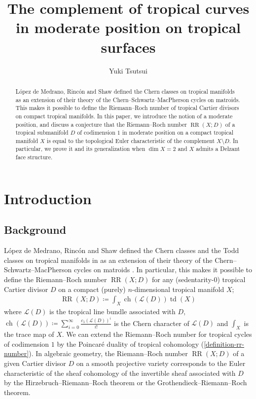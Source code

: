 \documentclass[a4paper,dvipdfmx,reqno,12pt]{amsart}
\title{The complement of tropical curves in moderate position on
tropical surfaces}
\author[Y. Tsutsui]{Yuki Tsutsui}
\theoremstyle{definition}
\newcommand{\deq}{\coloneqq}
\newcommand{\opn}[1]{\operatorname{#1}}
\numberwithin{equation}{section}
\begin{document}
\begin{abstract}
L\'opez de Medrano, Rinc\'on and Shaw defined 
the Chern classes on
tropical manifolds as an extension
of their theory of
the Chern--Schwartz--MacPherson cycles on matroids.
This makes it possible to define
the Riemann--Roch number of tropical Cartier divisors
on compact tropical manifolds.
In this paper,
we introduce the notion of a moderate position,
and discuss a conjecture
that the Riemann--Roch number
$\opn{RR}(X;D)$ of
a tropical submanifold $D$ of codimension $1$
in moderate position on
a compact tropical manifold
$X$ is equal to the topological Euler characteristic of 
the complement $X\setminus D$.
In particular, we prove it and 
its generalization when $\dim X=2$ and
$X$ admits a Delzant face structure.
\end{abstract}

\maketitle

\section{Introduction}
\subsection{Background}
L\'opez de Medrano, Rinc\'on and Shaw defined 
the Chern classes and the Todd classes on
tropical manifolds in \cite{demedrano2023chern}
as an extension
of their theory of
the Chern--Schwartz--MacPherson cycles on matroids
\cite{MR3999674}.
In particular, this makes it possible to define
the Riemann--Roch number $\opn{RR}(X;D)$
for any (sedentarity-0) tropical Cartier divisor $D$ on
a compact (purely) $n$-dimensional tropical manifold $X$;
\begin{align}
\label{equation-intro-rr}
\opn{RR}(X;D)\deq 
\int_{X}\opn{ch}(\mathcal{L}(D))\opn{td}(X)
\end{align}
where $\mathcal{L}(D)$ is the 
tropical line bundle associated with $D$,
$\opn{ch}(\mathcal{L}(D))\deq 
\sum_{i=0}^{\infty}\frac{c_1(\mathcal{L}(D))^{i}}{i!}$
is the Chern character of $\mathcal{L}(D)$
and $\int_X$ is the trace map of $X$.
We can extend the Riemann--Roch number for
tropical cycles of codimension $1$
by the Poincar\'e duality of tropical cohomology
(\cref{definition-rr-number}).
In algebraic geometry, the Riemann--Roch number
$\opn{RR}(X;D)$ of a given Cartier divisor $D$
on a smooth projective variety
corresponds to
the Euler characteristic of the sheaf cohomology
of the invertible sheaf 
associated with $D$ by the Hirzebruch--Riemann--Roch theorem
or the Grothendieck--Riemann--Roch theorem.
\end{document}
